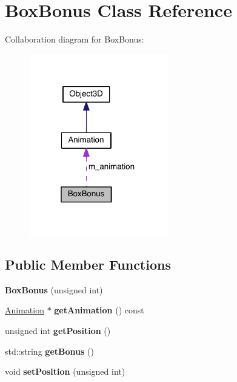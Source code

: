 \hypertarget{class_box_bonus}{}\section{Box\+Bonus Class Reference}
\label{class_box_bonus}


Collaboration diagram for Box\+Bonus\+:\nopagebreak
\begin{figure}[H]
\begin{center}
\leavevmode
\includegraphics[width=172pt]{class_box_bonus__coll__graph}
\end{center}
\end{figure}
\subsection*{Public Member Functions}
\begin{DoxyCompactItemize}
\item 
\hypertarget{class_box_bonus_aea4cd749fada7e0ba6b4958b6e9a2d5a}{}{\bfseries Box\+Bonus} (unsigned int)\label{class_box_bonus_aea4cd749fada7e0ba6b4958b6e9a2d5a}

\item 
\hypertarget{class_box_bonus_afcace339f1df3092f8727678a9c0b836}{}\hyperlink{class_animation}{Animation} $\ast$ {\bfseries get\+Animation} () const \label{class_box_bonus_afcace339f1df3092f8727678a9c0b836}

\item 
\hypertarget{class_box_bonus_a2202faa9c0f9b30b294d5aaef05b7836}{}unsigned int {\bfseries get\+Position} ()\label{class_box_bonus_a2202faa9c0f9b30b294d5aaef05b7836}

\item 
\hypertarget{class_box_bonus_a595cd18f7ae5050e9ec42fc0eaef36c4}{}std\+::string {\bfseries get\+Bonus} ()\label{class_box_bonus_a595cd18f7ae5050e9ec42fc0eaef36c4}

\item 
\hypertarget{class_box_bonus_a0ab1d0be10871f795d9275572ec91419}{}void {\bfseries set\+Position} (unsigned int)\label{class_box_bonus_a0ab1d0be10871f795d9275572ec91419}

\end{DoxyCompactItemize}
